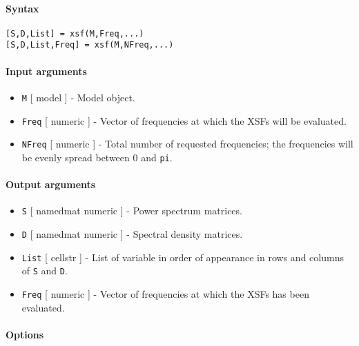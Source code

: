 


	\paragraph{Syntax}

\begin{verbatim}
[S,D,List] = xsf(M,Freq,...)
[S,D,List,Freq] = xsf(M,NFreq,...)
\end{verbatim}

\paragraph{Input arguments}

\begin{itemize}
\item
  \texttt{M} {[} model {]} - Model object.
\item
  \texttt{Freq} {[} numeric {]} - Vector of frequencies at which the
  XSFs will be evaluated.
\item
  \texttt{NFreq} {[} numeric {]} - Total number of requested
  frequencies; the frequencies will be evenly spread between 0 and
  \texttt{pi}.
\end{itemize}

\paragraph{Output arguments}

\begin{itemize}
\item
  \texttt{S} {[} namedmat \textbar{} numeric {]} - Power spectrum
  matrices.
\item
  \texttt{D} {[} namedmat \textbar{} numeric {]} - Spectral density
  matrices.
\item
  \texttt{List} {[} cellstr {]} - List of variable in order of
  appearance in rows and columns of \texttt{S} and \texttt{D}.
\item
  \texttt{Freq} {[} numeric {]} - Vector of frequencies at which the
  XSFs has been evaluated.
\end{itemize}

\paragraph{Options}

